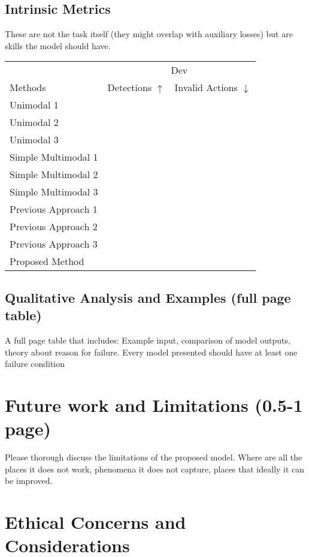 \documentclass[11pt,a4paper]{article}
\begin{document}
\subsection{Intrinsic Metrics}
These are not the task itself (they might overlap with auxiliary losses) but are skills the model should have.
\begin{table}[t]
\centering
\begin{tabular}{@{}lrr@{}}
\toprule
                            & \multicolumn{2}{c}{Dev} \\
Methods                     & Detections $\uparrow$ & Invalid Actions $\downarrow$  \\
\midrule
Unimodal 1 \cite{} & & \\
Unimodal 2 \cite{} & & \\
Unimodal 3 \cite{} & & \\
\midrule
Simple Multimodal 1 \cite{} & &  \\
Simple Multimodal 2 \cite{} & &  \\
Simple Multimodal 3 \cite{} & &  \\
\midrule
Previous Approach 1 \cite{} & &  \\
Previous Approach 2 \cite{} & &  \\
Previous Approach 3 \cite{} & &  \\
\midrule
Proposed Method             & &  \\
\bottomrule
\end{tabular}
\end{table}

\clearpage
\subsection{Qualitative Analysis and Examples (full page table)}
A full page table that includes: Example input, comparison of model outputs, theory about reason for failure. Every model presented should have at least one failure condition

\clearpage
\section{Future work and Limitations (0.5-1 page)}
Please thorough discuss the limitations of the proposed model.  Where are all the places it does not work, phenomena it does not capture, places that ideally it can be improved.

\clearpage
\section{Ethical Concerns and Considerations}
\end{document}
